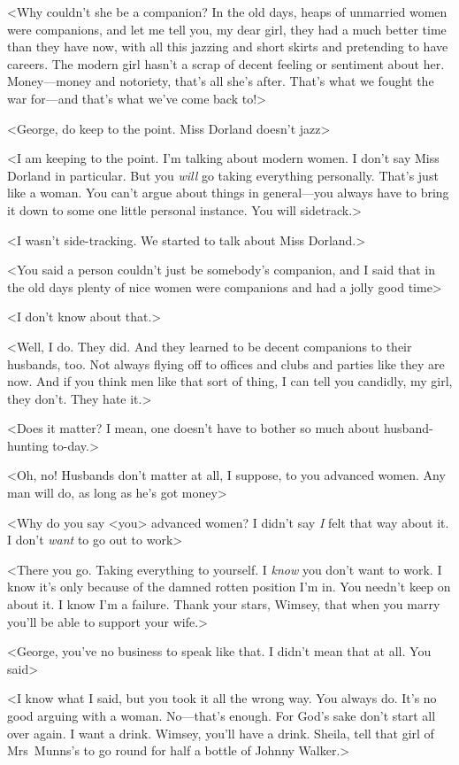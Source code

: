 <Why couldn't she be a companion? In the old days, heaps of unmarried women were companions, and let me tell you, my dear girl, they had a much better time than they have now, with all this jazzing and short skirts and pretending to have careers. The modern girl hasn't a scrap of decent feeling or sentiment about her. Money—money and notoriety, that's all she's after. That's what we fought the war for—and that's what we've come back to!>

<George, do keep to the point. Miss Dorland doesn't jazz\longdash>

<I am keeping to the point. I'm talking about modern women. I don't say Miss Dorland in particular. But you \emph{will} go taking everything personally. That's just like a woman. You can't argue about things in general—you always have to bring it down to some one little personal instance. You will sidetrack.>

<I wasn't side-tracking. We started to talk about Miss Dorland.>

<You said a person couldn't just be somebody's companion, and I said that in the old days plenty of nice women were companions and had a jolly good time\longdash>

<I don't know about that.>

<Well, I do. They did. And they learned to be decent companions to their husbands, too. Not always flying off to offices and clubs and parties like they are now. And if you think men like that sort of thing, I can tell you candidly, my girl, they don't. They hate it.>

<Does it matter? I mean, one doesn't have to bother so much about husband-hunting to-day.>

<Oh, no! Husbands don't matter at all, I suppose, to you advanced women. Any man will do, as long as he's got money\longdash>

<Why do you say <you> advanced women? I didn't say \emph{I} felt that way about it. I don't \emph{want} to go out to work\longdash>

<There you go. Taking everything to yourself. I \emph{know} you don't want to work. I know it's only because of the damned rotten position I'm in. You needn't keep on about it. I know I'm a failure. Thank your stars, Wimsey, that when you marry you'll be able to support your wife.>

<George, you've no business to speak like that. I didn't mean that at all. You said\longdash>

<I know what I said, but you took it all the wrong way. You always do. It's no good arguing with a woman. No—that's enough. For God's sake don't start all over again. I want a drink. Wimsey, you'll have a drink. Sheila, tell that girl of Mrs~Munns's to go round for half a bottle of Johnny Walker.>

